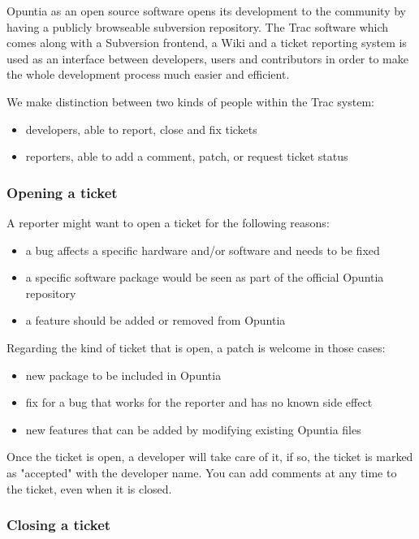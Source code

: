 Opuntia as an open source software opens its development to the community by
having a publicly browseable subversion repository. The Trac software which
comes along with a Subversion frontend,  a Wiki and a ticket reporting system 
is used as an interface between developers, users and contributors in order to 
make the whole development process much easier and efficient.

We make distinction between two kinds of people within the Trac system:

\begin{itemize}
\item developers, able to report, close and fix tickets
\item reporters, able to add a comment, patch, or request ticket status
\end{itemize}

\subsubsection{Opening a ticket}

A reporter might want to open a ticket for the following reasons:

\begin{itemize}
\item a bug affects a specific hardware and/or software and needs to be fixed
\item a specific software package would be seen as part of the official Opuntia repository
\item a feature should be added or removed from Opuntia
\end{itemize}

Regarding the kind of ticket that is open, a patch is welcome in those cases:

\begin{itemize}
\item new package to be included in Opuntia
\item fix for a bug that works for the reporter and has no known side effect
\item new features that can be added by modifying existing Opuntia files
\end{itemize}

Once the ticket is open, a developer will take care of it, if so, the ticket is marked
as "accepted" with the developer name. You can add comments at any time to the ticket,
even when it is closed.

\subsubsection{Closing a ticket}

